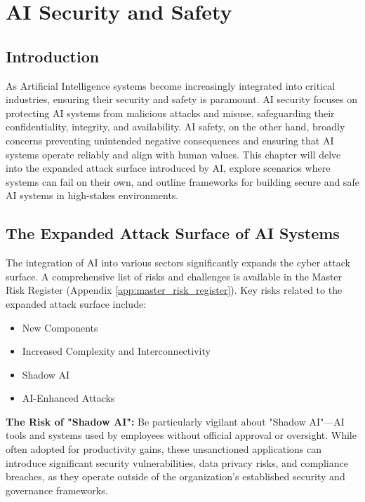 \chapter{AI Security and Safety}
\label{chap:ai_security_and_safety}

\section{Introduction}
\label{sec:security_introduction}
As Artificial Intelligence systems become increasingly integrated into critical industries, ensuring their security and safety is paramount. AI security focuses on protecting AI systems from malicious attacks and misuse, safeguarding their confidentiality, integrity, and availability. AI safety, on the other hand, broadly concerns preventing unintended negative consequences and ensuring that AI systems operate reliably and align with human values. This chapter will delve into the expanded attack surface introduced by AI, explore scenarios where systems can fail on their own, and outline frameworks for building secure and safe AI systems in high-stakes environments.

\section{The Expanded Attack Surface of AI Systems}
\label{sec:attack_surface}

The integration of AI into various sectors significantly expands the cyber attack surface. A comprehensive list of risks and challenges is available in the Master Risk Register (Appendix \ref{app:master_risk_register}). Key risks related to the expanded attack surface include:

\begin{itemize}
    \item New Components
    \item Increased Complexity and Interconnectivity
    \item Shadow AI
    \item AI-Enhanced Attacks
\end{itemize}

\begin{warningbox}
\textbf{The Risk of "Shadow AI":} Be particularly vigilant about "Shadow AI"—AI tools and systems used by employees without official approval or oversight. While often adopted for productivity gains, these unsanctioned applications can introduce significant security vulnerabilities, data privacy risks, and compliance breaches, as they operate outside of the organization's established security and governance frameworks.
\end{warningbox}

